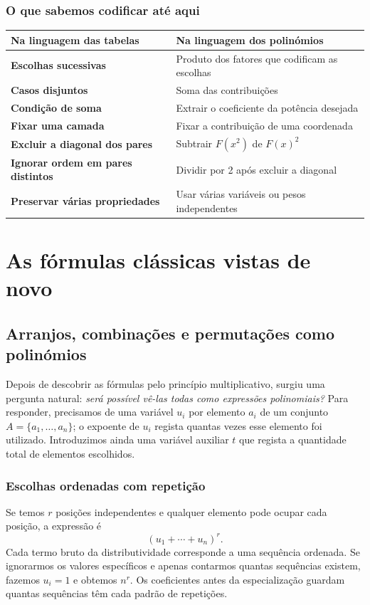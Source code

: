 \documentclass[11pt,a4paper,oneside]{book}
\begin{document}
\section{O que sabemos codificar até aqui}
\begin{center}\small
\begin{tabularx}{\textwidth}{>{\bfseries}p{3.85cm}X}
\toprule
Na linguagem das tabelas & Na linguagem dos polinómios\\\midrule
Escolhas sucessivas & Produto dos fatores que codificam as escolhas\\
Casos disjuntos & Soma das contribuições\\
Condição de soma & Extrair o coeficiente da potência desejada\\
Fixar uma camada & Fixar a contribuição de uma coordenada\\
Excluir a diagonal dos pares & Subtrair $F(x^2)$ de $F(x)^2$\\
Ignorar ordem em pares distintos & Dividir por 2 após excluir a diagonal\\
Preservar várias propriedades & Usar várias variáveis ou pesos independentes\\
\bottomrule
\end{tabularx}
\end{center}
\part{As fórmulas clássicas vistas de novo}
\chapter{Arranjos, combinações e permutações como polinómios}
Depois de descobrir as fórmulas pelo princípio multiplicativo, surgiu uma pergunta natural: \emph{será possível vê-las todas como expressões polinomiais?} Para responder, precisamos de uma variável $u_i$ por elemento $a_i$ de um conjunto $A=\{a_1,\ldots,a_n\}$; o expoente de $u_i$ regista quantas vezes esse elemento foi utilizado. Introduzimos ainda uma variável auxiliar $t$ que regista a quantidade total de elementos escolhidos.

\section{Escolhas ordenadas com repetição}
Se temos $r$ posições independentes e qualquer elemento pode ocupar cada posição, a expressão é
\[
(u_1+\cdots+u_n)^r.
\]
Cada termo bruto da distributividade corresponde a uma sequência ordenada. Se ignorarmos os valores específicos e apenas contarmos quantas sequências existem, fazemos $u_i=1$ e obtemos $n^r$. Os coeficientes antes da especialização guardam quantas sequências têm cada padrão de repetições.
\end{document}
